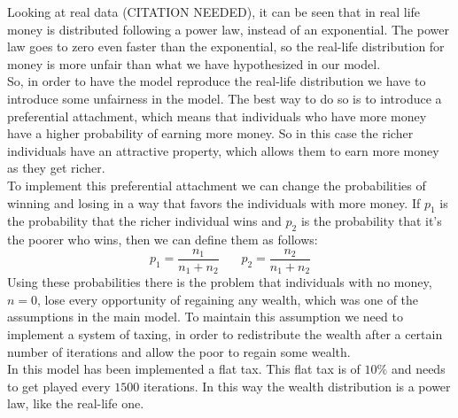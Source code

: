 Looking at real data (CITATION NEEDED), it can be seen that in real life money is distributed following a power law, instead of an exponential. The power law goes to zero even faster than the exponential, so the real-life distribution for money is more unfair than what we have hypothesized in our model. \\
So, in order to have the model reproduce the real-life distribution we have to introduce some unfairness in the model. The best way to do so is to introduce a preferential attachment, which means that individuals who have more money have a higher probability of earning more money. So in this case the richer individuals have an attractive property, which allows them to earn more money as they get richer. \\
To implement this preferential attachment we can change the probabilities of winning and losing in a way that favors the individuals with more money. If $p_1$ is the probability that the richer individual wins and $p_2$ is the probability that it's the poorer who wins, then we can define them as follows:
\begin{equation}
	p_1 = \frac{n_1}{n_1+n_2} \ \ \ \ \ \ \ \  p_2 = \frac{n_2}{n_1+n_2}
\end{equation}
Using these probabilities there is the problem that individuals with no money, $n = 0$, lose every opportunity of regaining any wealth, which was one of the assumptions in the main model. To maintain this assumption we need to implement a system of taxing, in order to redistribute the wealth after a certain number of iterations and allow the poor to regain some wealth. \\
In this model has been implemented a flat tax. This flat tax is of $10\%$ and needs to get played every $1500$ iterations. In this way the wealth distribution is a power law, like the real-life one.

